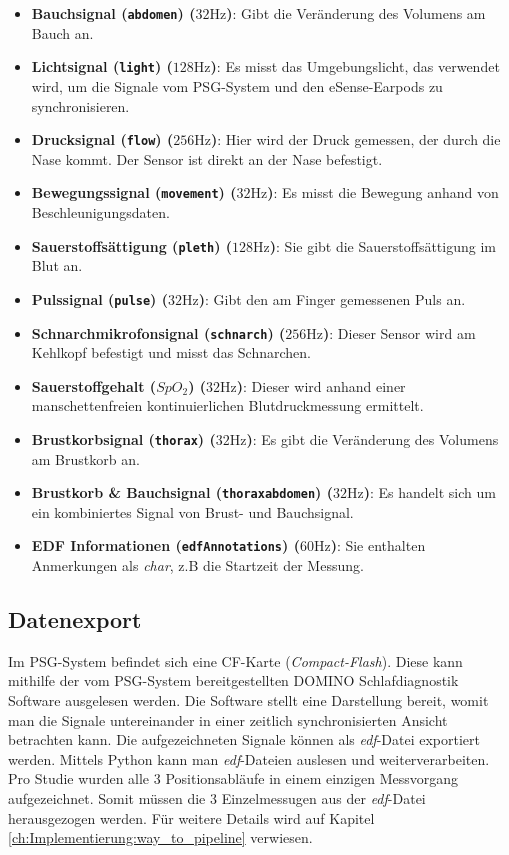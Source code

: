 \begin{itemize}
    \item \textbf{Bauchsignal (\texttt{abdomen}) ($32 \si{\hertz}$)}: Gibt die Veränderung des Volumens am Bauch an.
    \item \textbf{Lichtsignal (\texttt{light}) ($128 \si{\hertz}$)}: Es misst das Umgebungslicht, das verwendet wird, um die Signale vom PSG-System und den eSense-Earpods zu synchronisieren.
    \item \textbf{Drucksignal (\texttt{flow}) ($256 \si{\hertz}$)}: Hier wird der Druck gemessen, der durch die Nase kommt. Der Sensor ist direkt an der Nase befestigt.
    \item \textbf{Bewegungssignal (\texttt{movement}) ($32 \si{\hertz}$)}: Es misst die Bewegung anhand von Beschleunigungsdaten.
    \item \textbf{Sauerstoffsättigung (\texttt{pleth}) ($128 \si{\hertz}$)}: Sie gibt die Sauerstoffsättigung im Blut an.
    \item \textbf{Pulssignal (\texttt{pulse}) ($32 \si{\hertz}$)}: Gibt den am Finger gemessenen Puls an.
    \item \textbf{Schnarchmikrofonsignal (\texttt{schnarch}) ($256 \si{\hertz}$)}: Dieser Sensor wird am Kehlkopf befestigt und misst das Schnarchen.
    \item \textbf{Sauerstoffgehalt (\texttt{$SpO_2$}) ($32 \si{\hertz}$)}: Dieser wird anhand einer manschettenfreien kontinuierlichen Blutdruckmessung ermittelt.
    \item \textbf{Brustkorbsignal (\texttt{thorax}) ($32 \si{\hertz}$)}: Es gibt die Veränderung des Volumens am Brustkorb an.
    \item \textbf{Brustkorb \& Bauchsignal (\texttt{thoraxabdomen}) ($32 \si{\hertz}$)}: Es handelt sich um ein kombiniertes Signal von Brust- und Bauchsignal.
    \item \textbf{EDF Informationen (\texttt{edfAnnotations}) ($60 \si{\hertz}$)}: Sie enthalten Anmerkungen als \textit{char}, z.B die Startzeit der Messung.
\end{itemize}

\subsection{Datenexport}
\label{ch:sa:psg:export}

Im PSG-System befindet sich eine CF-Karte (\textit{Compact-Flash}). Diese kann mithilfe der vom PSG-System bereitgestellten {\glqq DOMINO Schlafdiagnostik\grqq} Software ausgelesen werden.
Die Software stellt eine Darstellung bereit, womit man die Signale untereinander in einer zeitlich synchronisierten Ansicht betrachten kann. Die aufgezeichneten Signale können als \textit{edf}-Datei exportiert werden.
Mittels Python kann man \textit{edf}-Dateien auslesen und weiterverarbeiten.
Pro Studie wurden alle 3 Positionsabläufe in einem einzigen Messvorgang aufgezeichnet. Somit müssen die 3 Einzelmessugen aus der \textit{edf}-Datei herausgezogen werden.
Für weitere Details wird auf Kapitel \ref{ch:Implementierung:way_to_pipeline} verwiesen.

